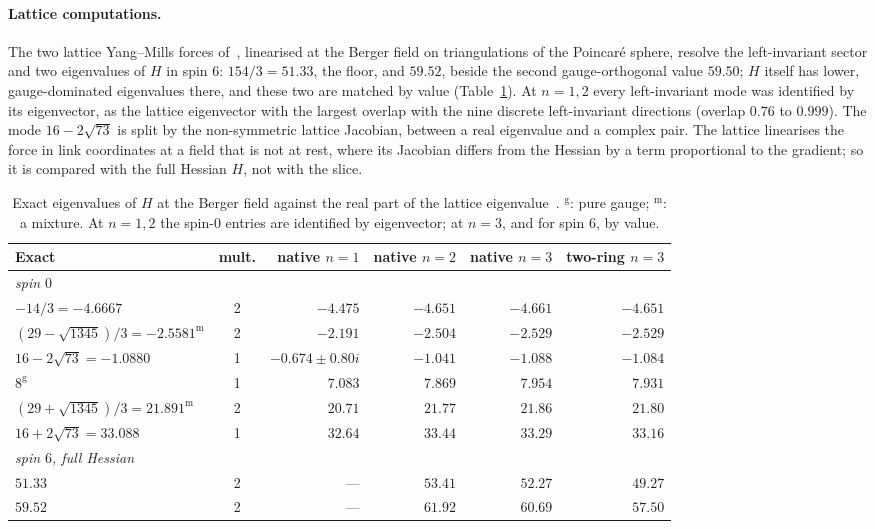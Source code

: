 \documentclass[11pt]{article}
\theoremstyle{definition}
\theoremstyle{remark}
\begin{document}
\paragraph{Lattice computations.} The two lattice Yang--Mills forces of~\cite{davisrtc}, linearised
at the Berger field on triangulations of the Poincar\'e sphere, resolve the left-invariant sector and
two eigenvalues of $H$ in spin $6$: $154/3=51.33$, the floor, and $59.52$, beside the second gauge-orthogonal value $59.50$; $H$ itself has lower, gauge-dominated eigenvalues there, and these two are matched by value (Table~\ref{tab:lattice}). At $n=1,2$ every left-invariant mode was identified
by its eigenvector, as the lattice eigenvector with the largest overlap with the nine discrete
left-invariant directions (overlap $0.76$ to $0.999$). The mode $16-2\sqrt{73}$ is split by the
non-symmetric lattice Jacobian, between a real eigenvalue and a complex pair. The lattice linearises
the force in link coordinates at a field that is not at rest, where its Jacobian differs from the
Hessian by a term proportional to the gradient; so it is compared with the full Hessian $H$, not with
the slice.

\begin{table}[t]\centering\small
\caption{Exact eigenvalues of $H$ at the Berger field against the real part of the lattice
eigenvalue~\cite{davisrtc}. $^{\mathrm g}$: pure gauge; $^{\mathrm m}$: a mixture. At $n=1,2$ the
spin-$0$ entries are identified by eigenvector; at $n=3$, and for spin $6$, by value.}
\label{tab:lattice}
\begin{tabular}{lcrrrr}\toprule
Exact & mult. & native $n=1$ & native $n=2$ & native $n=3$ & two-ring $n=3$ \\ \midrule
\multicolumn{6}{l}{\emph{spin $0$}}\\
$-14/3=-4.6667$ & 2 & $-4.475$ & $-4.651$ & $-4.661$ & $-4.651$ \\
$(29-\sqrt{1345})/3=-2.5581^{\mathrm m}$ & 2 & $-2.191$ & $-2.504$ & $-2.529$ & $-2.529$ \\
$16-2\sqrt{73}=-1.0880$ & 1 & $-0.674\pm0.80i$ & $-1.041$ & $-1.088$ & $-1.084$ \\
$8^{\mathrm g}$ & 1 & $7.083$ & $7.869$ & $7.954$ & $7.931$ \\
$(29+\sqrt{1345})/3=21.891^{\mathrm m}$ & 2 & $20.71$ & $21.77$ & $21.86$ & $21.80$ \\
$16+2\sqrt{73}=33.088$ & 1 & $32.64$ & $33.44$ & $33.29$ & $33.16$ \\ \midrule
\multicolumn{6}{l}{\emph{spin $6$, full Hessian}}\\
$51.33$ & 2 & --- & $53.41$ & $52.27$ & $49.27$ \\
$59.52$ & 2 & --- & $61.92$ & $60.69$ & $57.50$ \\
\bottomrule\end{tabular}
\end{table}
\end{document}
